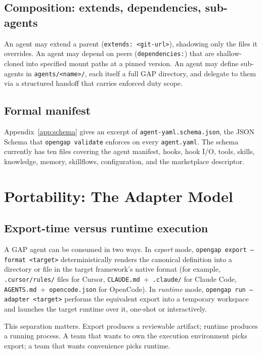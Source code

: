 \documentclass[11pt,a4paper]{article}
\begin{document}
\subsection{Composition: extends, dependencies, sub-agents}

An agent may extend a parent (\texttt{extends: <git-url>}), shadowing only the files
it overrides. An agent may depend on peers (\texttt{dependencies:}) that are
shallow-cloned into specified mount paths at a pinned version. An agent may define
sub-agents in \texttt{agents/<name>/}, each itself a full GAP directory, and delegate
to them via a structured handoff that carries enforced duty scope.

\subsection{Formal manifest}

Appendix~\ref{app:schema} gives an excerpt of \texttt{agent-yaml.schema.json}, the
JSON Schema that \texttt{opengap validate} enforces on every \texttt{agent.yaml}. The
schema currently has ten files covering the agent manifest, hooks, hook I/O, tools,
skills, knowledge, memory, skillflows, configuration, and the marketplace descriptor.

\section{Portability: The Adapter Model}\label{sec:portability}

\subsection{Export-time versus runtime execution}

A GAP agent can be consumed in two ways. In \emph{export} mode, \texttt{opengap export
--format <target>} deterministically renders the canonical definition into a directory
or file in the target framework's native format (for example, \texttt{.cursor/rules/}
files for Cursor, \texttt{CLAUDE.md}~+~\texttt{.claude/} for Claude Code,
\texttt{AGENTS.md}~+~\texttt{opencode.json} for OpenCode). In \emph{runtime} mode,
\texttt{opengap run --adapter <target>} performs the equivalent export into a temporary
workspace and launches the target runtime over it, one-shot or interactively.

This separation matters. Export produces a reviewable artifact; runtime produces a
running process. A team that wants to own the execution environment picks export;
a team that wants convenience picks runtime.
\end{document}
